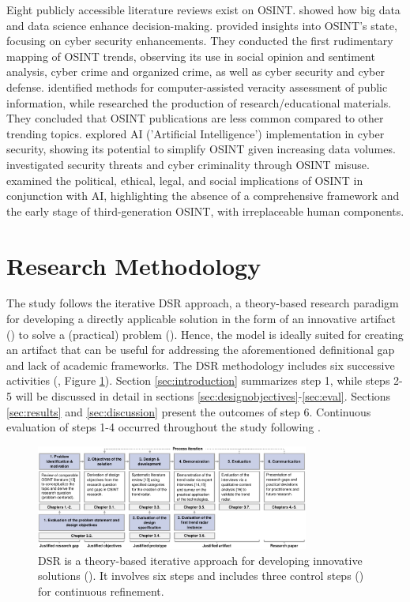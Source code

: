 \documentclass[10pt]{article}
\begin{document}
Eight publicly accessible literature reviews exist on OSINT. \textcite{DosPassos.2017} showed how big data and data science enhance decision-making. \textcite{PastorGalindo.2019, PastorGalindo.2020}
provided insights into OSINT's state, focusing on cyber security
enhancements. They conducted the first rudimentary mapping of OSINT trends, observing its use in social opinion and sentiment
analysis, cyber crime and organized crime, as well as cyber security and cyber defense. \textcite{GarciaLozano.2020} identified methods for computer-assisted veracity assessment of public information, while
\textcite{HerreraCubides.2020} researched the production of research/educational materials. They concluded that OSINT
publications are less common compared to other trending topics. \textcite{Yogish.2021} explored AI ('Artificial Intelligence') implementation in cyber security,
showing its potential to simplify OSINT given increasing data volumes. 
\textcite{Hwang.2022} investigated security threats and cyber criminality through OSINT misuse.
\textcite{Ghioni.2023} examined the political, ethical, legal, and social implications of
OSINT in conjunction with AI, highlighting the absence of a comprehensive framework and the early stage of third-generation OSINT, with irreplaceable human components.

\section{Research Methodology}

The study follows the iterative DSR approach, a theory-based research paradigm for developing a directly applicable solution in the form of an innovative artifact (\cite{vomBrocke.2020b})
to solve a (practical) problem (\cite{Peffers.2007}). Hence, the model is ideally suited for creating an artifact that can be useful for addressing the aforementioned definitional gap and lack of academic frameworks. The DSR methodology includes
six successive activities (\cite{Peffers.2007}, Figure \ref{fig: DSRM}). Section \ref{sec:introduction} summarizes step 1, while steps 2-5 will be discussed in detail in sections \ref{sec:designobjectives}-\ref{sec:eval}. Sections \ref{sec:results} and \ref{sec:discussion} present the outcomes of step 6. Continuous evaluation of steps 1-4 occurred throughout the study following \textcite{Sonnenberg.2012}.

\begin{figure}[thb]
    \centering
    \includegraphics[width=0.8\textwidth]{PDF/images/cropped DSR_V01.pdf}
    \caption{DSR is a theory-based iterative approach for developing innovative solutions (\cite{Peffers.2007}). It involves six steps and includes three control steps (\cite{Sonnenberg.2012}) for continuous refinement.}
    \label{fig: DSRM}
\end{figure}
\end{document}
